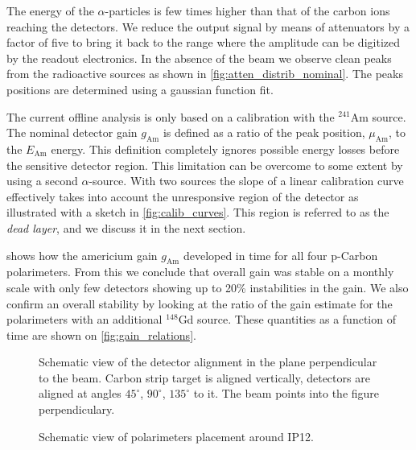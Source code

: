 \documentclass[a4paper,12pt]{article}
\newcommand\americium{${}^{241}$Am}
\newcommand\gadolinium{${}^{148}$Gd}
\newcommand\gainAm{$g_\text{Am}$}
\begin{document}
The energy of the $\alpha$-particles is few times higher than that of the
carbon ions reaching the detectors. We reduce the output signal by means of
attenuators by a factor of five to bring it back to the range where the
amplitude can be digitized by the readout electronics. In the absence of the
beam we observe clean peaks from the radioactive sources as shown in
\cref{fig:atten_distrib_nominal}. The peaks positions are determined using a
gaussian function fit.

The current offline analysis is only based on a calibration with the \americium{} source.
The nominal detector gain \gainAm{} is
defined as a ratio of the peak position, $\mu_{\text{Am}}$, to the
$E_{\text{Am}}$ energy. This definition completely ignores possible energy
losses before the sensitive detector region. This limitation can be overcome
to some extent by using a second $\alpha$-source. With two sources the slope of
a linear calibration curve effectively takes into account the unresponsive
region of the detector as illustrated with a sketch in
\cref{fig:calib_curves}. This region is referred to as the {\it dead
layer}, and we discuss it in the next section.

 shows how the americium gain \gainAm{} developed in time for all
four p-Carbon polarimeters. From this we conclude that overall gain was
stable on a monthly scale with only few detectors showing up to 20\%
instabilities in the gain. We also confirm an overall stability by looking at
the ratio of the gain estimate for the polarimeters with an additional
\gadolinium{} source. These quantities as a function of time are shown on
\cref{fig:gain_relations}.


\newcommand\amgainlabel{Time dependence of the detector gain $g_\text{Am}$ as
measured with $\alpha$-particles emitted by the \americium{} source. Colors
represent individual detectors.}

\begin{figure}
\begin{center}

\end{center}
\caption{Schematic view of the detector alignment in the plane perpendicular to
the beam. Carbon strip target is aligned vertically, detectors are aligned at
angles $45^\circ$, $90^\circ$, $135^\circ$ to it. The beam points into the
figure perpendiculary.}
\end{figure}

\begin{figure}
\begin{center}

\end{center}
\caption{Schematic view of polarimeters placement around IP12.}
\label{fig:polarim_placement}
\end{figure}
\end{document}
